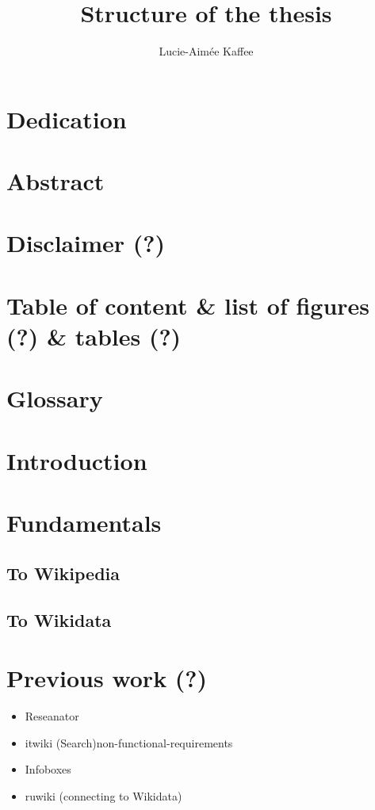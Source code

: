 \documentclass[11pt]{article}
\title {{Structure of the thesis}}
\author {Lucie-Aim\'{e}e Kaffee}
\date{}
\begin{document}
\maketitle

\section{Dedication}

\section{Abstract}

\section{Disclaimer (?)}

\section{Table of content \& list of figures (?) \& tables (?)}

\section {Glossary}

\section{Introduction}

\section{Fundamentals}
\subsection{To Wikipedia}
\subsection{To Wikidata}

\section{Previous work (?)}
\begin{itemize}
\item Reseanator
\item itwiki (Search)non-functional-requirements
\item Infoboxes
\item ruwiki (connecting to Wikidata)
\end{itemize}
\end{document}
